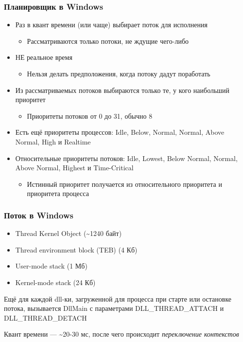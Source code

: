 \documentclass[xetex,mathserif,serif]{beamer}
\begin{document}
    \begin{frame}
        \frametitle{Планировщик в Windows}
        \begin{itemize}
            \item Раз в квант времени (или чаще) выбирает поток для исполнения
            \begin{itemize}
                \item Рассматриваются только потоки, не ждущие чего-либо
            \end{itemize}
            \item НЕ реальное время
            \begin{itemize}
                \item Нельзя делать предположения, когда потоку дадут поработать
            \end{itemize}
            \item Из рассматриваемых потоков выбираются только те, у кого наибольший приоритет
            \begin{itemize}
                \item Приоритеты потоков от 0 до 31, обычно 8
            \end{itemize}
            \item Есть ещё приоритеты процессов: Idle, Below, Normal, Normal, Above Normal, High и Realtime
            \item Относительные приоритеты потоков: Idle, Lowest, Below Normal, Normal, Above Normal, Highest и Time-Critical
            \begin{itemize}
                \item Истинный приоритет получается из относительного приоритета и приоритета процесса
            \end{itemize}
        \end{itemize}
    \end{frame}

    \begin{frame}
        \frametitle{Поток в Windows}
        \begin{itemize}
            \item Thread Kernel Object (\textasciitilde1240 байт)
            \item Thread environment block (TEB) (4 Кб)
            \item User-mode stack (1 Мб)
            \item Kernel-mode stack (24 Кб)
        \end{itemize}

        Ещё для каждой dll-ки, загруженной для процесса при старте или остановке потока, вызывается DllMain с параметрами DLL\_THREAD\_ATTACH и DLL\_THREAD\_DETACH

        \vspace{3mm}
        Квант времени --- \textasciitilde20-30 мс, после чего происходит \textit{переключение контекстов}
    \end{frame}
\end{document}
